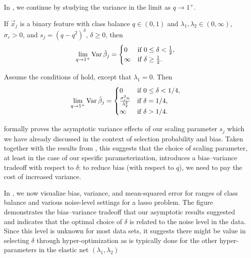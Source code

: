 In , we continue by studying the variance in the limit as \(q \rightarrow 1^+\).

\begin{theorem}
  \label{thm:classbalance-variance}
  If \(\vec{x}_j\) is a binary feature with class balance \(q \in (0, 1)\) and \(\lambda_1,\lambda_2 \in (0,\infty)\), \(\sigma_\varepsilon > 0\), and \(s_j = (q - q^2)^{\delta}\), \(\delta \geq 0\), then
  \[
    \lim_{q \rightarrow 1^+} \operatorname{Var} \hat{\beta}_j =
    \begin{cases}
      0      & \text{if } 0 \leq \delta < \frac{1}{2}, \\
      \infty & \text{if } \delta \geq \frac{1}{2}.
    \end{cases}
  \]
\end{theorem}

\begin{corollary}
  \label{cor:ridge-variance}
  Assume the conditions of  hold, except that \(\lambda_1 = 0\). Then
  \[
    \lim_{q \rightarrow 1^+} \operatorname{Var} \hat{\beta}_j =
    \begin{cases}
      0                                          & \text{if } 0 \leq \delta < 1/4, \\
      \frac{\sigma_\varepsilon^2 n}{\lambda_2^2} & \text{if } \delta = 1/4,        \\
      \infty                                     & \text{if } \delta > 1/4.
    \end{cases}
  \]
\end{corollary}

 formally proves the asymptotic variance effects of our scaling parameter \(s_j\) which we have already discussed in the context of selection probability and bias. Taken together with the results from , this suggests that the choice of scaling parameter, at least in the case of our specific parameterization, introduces a bias--variance tradeoff with respect to \(\delta\): to reduce bias (with respect to \(q\)), we need to pay the cost of increased variance.

In , we now visualize bias, variance, and mean-squared error for ranges of class balance and various noise-level settings for a lasso problem. The figure demonstrates the bias--variance tradeoff that our asymptotic results suggested and indicates that the optimal choice of \(\delta\) is related to the noise level in the data. Since this level is unknown for most data sets, it suggests there might be value in selecting \(\delta\) through hyper-optimization as is typically done for the other hyper-parameters in the elastic net \((\lambda_1, \lambda_2)\)

